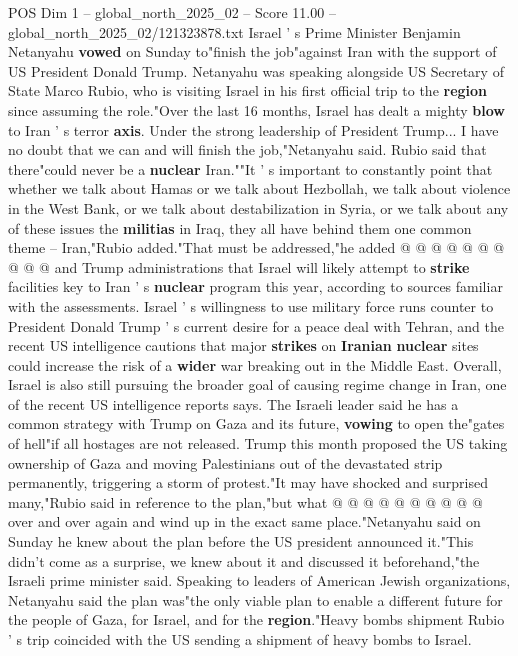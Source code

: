 \begin{textsample}{POS Dim 1 – global\_north\_2025\_02 – Score 11.00 – global\_north\_2025\_02/121323878.txt}  \label{ex:f1_pos_441}
Israel ' s Prime Minister Benjamin Netanyahu \textbf{vowed} on Sunday to"finish the job"against Iran with the support of US President Donald Trump.
Netanyahu was speaking alongside US Secretary of State Marco Rubio, who is visiting Israel in his first official trip to the \textbf{region} since assuming the role."Over the last 16 months, Israel has dealt a mighty \textbf{blow} to Iran ' s terror \textbf{axis}.
Under the strong leadership of President Trump...
I have no doubt that we can and will finish the job,"Netanyahu said.
Rubio said that there"could never be a \textbf{nuclear} Iran.""It ' s important to constantly point that whether we talk about Hamas or we talk about Hezbollah, we talk about violence in the West Bank, or we talk about destabilization in Syria, or we talk about any of these issues the \textbf{militias} in Iraq, they all have behind them one common theme -- Iran,"Rubio added."That must be addressed,"he added @ @ @ @ @ @ @ @ @ @ and Trump administrations that Israel will likely attempt to \textbf{strike} facilities key to Iran ' s \textbf{nuclear} program this year, according to sources familiar with the assessments.
Israel ' s willingness to use military force runs counter to President Donald Trump ' s current desire for a peace deal with Tehran, and the recent US intelligence cautions that major \textbf{strikes} on \textbf{Iranian} \textbf{nuclear} sites could increase the risk of a \textbf{wider} war breaking out in the Middle East.
Overall, Israel is also still pursuing the broader goal of causing regime change in Iran, one of the recent US intelligence reports says.
The Israeli leader said he has a common strategy with Trump on Gaza and its future, \textbf{vowing} to open the"gates of hell"if all hostages are not released.
Trump this month proposed the US taking ownership of Gaza and moving Palestinians out of the devastated strip permanently, triggering a storm of protest."It may have shocked and surprised many,"Rubio said in reference to the plan,"but what @ @ @ @ @ @ @ @ @ @ over and over again and wind up in the exact same place."Netanyahu said on Sunday he knew about the plan before the US president announced it."This didn't come as a surprise, we knew about it and discussed it beforehand,"the Israeli prime minister said.
Speaking to leaders of American Jewish organizations, Netanyahu said the plan was"the only viable plan to enable a different future for the people of Gaza, for Israel, and for the \textbf{region}."Heavy bombs shipment Rubio ' s trip coincided with the US sending a shipment of heavy bombs to Israel.

\end{textsample}
